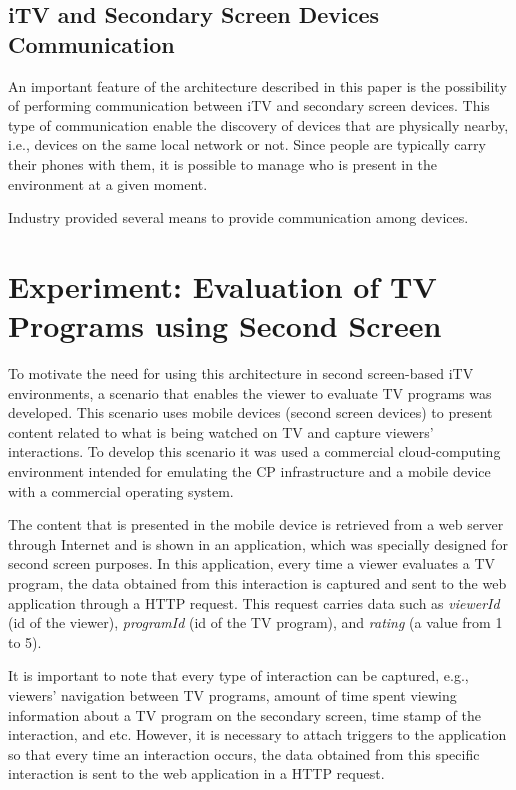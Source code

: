 \documentclass[journal]{IEEEtran}
\begin{document}
\subsection{iTV and Secondary Screen Devices Communication}

An important feature of the architecture described in this paper is the possibility of performing communication between iTV and secondary screen devices. This type of communication enable the discovery of devices that are physically nearby, i.e., devices on the same local network or not. Since people are typically carry their phones with them, it is possible to manage who is present in the environment at a given moment.

Industry provided several means to provide communication among devices.

\section{Experiment: Evaluation of TV Programs using Second Screen}


To motivate the need for using this architecture in second screen-based iTV environments, a scenario that enables the viewer to evaluate TV programs was developed. This scenario uses mobile devices (second screen devices) to present content related to what is being watched on TV and capture viewers' interactions. To develop this scenario it was used a commercial cloud-computing environment intended for emulating the CP infrastructure and a mobile device with a commercial operating system.

The content that is presented in the mobile device is retrieved from a web server through Internet and is shown in an application, which was specially designed for second screen purposes. In this application, every time a viewer evaluates a TV program, the data obtained from this interaction is captured and sent to the web application through a HTTP request. This request carries data such as \emph{viewerId} (id of the viewer), \emph{programId} (id of the TV program), and \emph{rating} (a value from 1 to 5).

It is important to note that every type of interaction can be captured, e.g., viewers' navigation between TV programs, amount of time spent viewing information about a TV program on the secondary screen, time stamp of the interaction, and etc. However, it is necessary to attach triggers to the application so that every time an interaction occurs, the data obtained from this specific interaction is sent to the web application in a HTTP request.
\end{document}
